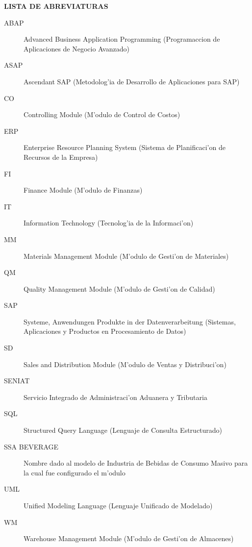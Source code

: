 \setcounter{page}{14}

\newpage

\begin{center}
	{\bf LISTA DE ABREVIATURAS} \label{chap:lista}
\end{center}
\begin{description}
\item[ABAP] Advanced Business Application Programming (Programaccion de Aplicaciones de Negocio Avanzado)
\item[ASAP] Ascendant SAP (Metodolog'ia de Desarrollo de Aplicaciones para SAP)
\item [CO] Controlling Module (M'odulo de Control de Costos)
\item[ERP] Enterprise Resource Planning System (Sistema de Planificaci'on de Recursos de la Empresa)
\item[FI] Finance Module (M'odulo de Finanzas)
\item[IT] Information Technology (Tecnolog'ia de la Informaci'on)
\item[MM] Materials Management Module (M'odulo de Gesti'on de Materiales)
\item[QM] Quality Management Module (M'odulo de Gesti'on de Calidad)
\item[SAP] Systeme, Anwendungen Produkte in der Datenverarbeitung (Sistemas, Aplicaciones y Productos en Procesamiento de Datos)
\item[SD] Sales and Distribution Module (M'odulo de Ventas y Distribuci'on)
\item[SENIAT] Servicio Integrado de Administraci'on Aduanera y Tributaria
\item[SQL] Structured Query Language (Lenguaje de Consulta Estructurado)
\item[SSA BEVERAGE] Nombre dado al modelo de Industria de Bebidas de Consumo Masivo para la cual fue configurado el m'odulo
\item[UML] Unified Modeling Language (Lenguaje Unificado de Modelado)
\item[WM] Warehouse Management Module (M'odulo de Gesti'on de Almacenes)
\end{description}

\newpage

